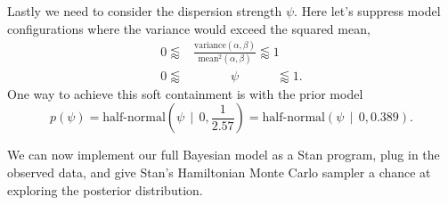 \documentclass[
  letterpaper,
  DIV=11,
  numbers=noendperiod]{scrartcl}
\begin{document}
Lastly we need to consider the dispersion strength \(\psi\). Here let's
suppress model configurations where the variance would exceed the
squared mean, \begin{align*}
0 \lessapprox
&\frac{ \text{variance}(\alpha, \beta) }{ \text{mean}^{2}(\alpha, \beta) }
\lessapprox 1
\\
0 \lessapprox & \quad\quad\;\;\;\, \psi \quad\quad\;\;\;\,  \lessapprox 1.
\end{align*} One way to achieve this soft containment is with the prior
model \[
p( \psi )
= \text{half-normal} \left( \psi \;\, \bigg| \;\, 0, \frac{1}{2.57} \right)
= \text{half-normal} \left( \psi \;\, \bigg| \;\, 0, 0.389 \right).
\]

We can now implement our full Bayesian model as a Stan program, plug in
the observed data, and give Stan's Hamiltonian Monte Carlo sampler a
chance at exploring the posterior distribution.
\end{document}
